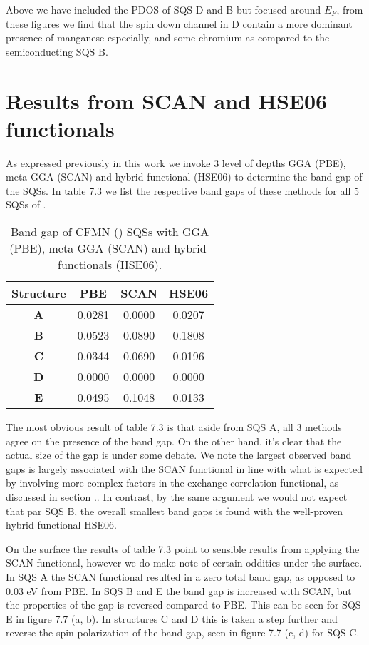 Above we have included the PDOS of SQS D and B but focused around $E_F$, from these figures we find that the spin down channel in D contain a more dominant presence of manganese especially, and some chromium as compared to the semiconducting SQS B.  

\section{Results from SCAN and HSE06 functionals}

As expressed previously in this work we invoke 3 level of depths GGA (PBE), meta-GGA (SCAN) and hybrid functional (HSE06) to determine the band gap of the SQSs. In table 7.3 we list the respective band gaps of these methods for all 5 SQSs of .

\begin{table}[H]
\centering
\begin{tabular}{@{}cccc@{}}
\toprule
Structure  & PBE    & SCAN   & HSE06  \\ \midrule
\textbf{A} & 0.0281 & 0.0000 & 0.0207 \\
\textbf{B} & 0.0523 & 0.0890 & 0.1808 \\
\textbf{C} & 0.0344 & 0.0690 & 0.0196 \\
\textbf{D} & 0.0000 & 0.0000 & 0.0000 \\
\textbf{E} & 0.0495 & 0.1048 & 0.0133 \\ \bottomrule
\end{tabular}
\caption{Band gap of CFMN () SQSs with GGA (PBE), meta-GGA (SCAN) and hybrid-functionals (HSE06).}
\end{table}

The most obvious result of table 7.3 is that aside from SQS A, all 3 methods agree on the presence of the band gap. On the other hand, it's clear that the actual size of the gap is under some debate. We note the largest observed band gaps is largely associated with the SCAN functional in line with what is expected by involving more complex factors in the exchange-correlation functional, as discussed in section .. In contrast, by the same argument we would not expect that par SQS B, the overall smallest band gaps is found with the well-proven hybrid functional HSE06.
 
On the surface the results of table 7.3 point to sensible results from applying the SCAN functional, however we do make note of certain oddities under the surface. In SQS A the SCAN functional resulted in a zero total band gap, as opposed to 0.03 eV from PBE. In SQS B and E the band gap is increased with SCAN, but the properties of the gap is reversed compared to PBE. This can be seen for SQS E in figure 7.7 (a, b). In structures C and D this is taken a step further and reverse the spin polarization of the band gap, seen in figure 7.7 (c, d) for SQS C.
 
